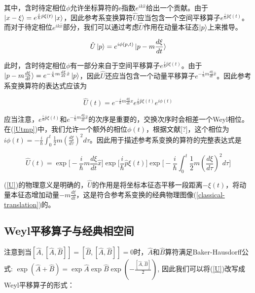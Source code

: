 \documentclass[a4paper]{article}
\begin{document}
        其中，含时待定相位$\phi$允许坐标算符的e指数$e^{ik\hat{x}}$给出一个贡献。由于$\ket{x-\xi}=e^{\frac{i}{\hbar}\hat{p}\xi(t)}\ket{x}$，因此参考系变换算符$\hat{U}$应当包含一个空间平移算子$e^{\frac{i}{\hbar}\hat{p}\xi(t)}$。而对于待定相位$e^{ik\hat{x}}$部分，我们可以通过考虑$\hat{U}$作用在动量本征态$\ket{p}$上来推导。

        \begin{equation}
            \hat{U}\ket{p}=e^{i\phi(p,t)}\ket{p-m\frac{d\xi}{dt}}
        \end{equation}

        此时，含时待定相位$\phi$有一部分来自于空间平移算子$e^{\frac{i}{\hbar}\hat{p}\xi(t)}$。由于$\ket{p-m\frac{d\xi}{dt}}=e^{-\frac{i}{\hbar}m\frac{d\xi}{dt}\hat{x}}\ket{p}$，因此$\hat{U}$还应当包含一个动量平移算子$e^{-\frac{i}{\hbar}m\frac{d\xi}{dt}\hat{x}}$。因此参考系变换算符的表达式应该为

        \begin{equation}\label{Utmp}
            \hat{U}(t)=e^{-\frac{i}{\hbar}m\frac{d\xi}{dt}\hat{x}}e^{\frac{i}{\hbar}\hat{p}\xi(t)}e^{i\phi(t)} 
        \end{equation}

        应当注意，$e^{\frac{i}{\hbar}\hat{p}\xi(t)}$和$e^{-\frac{i}{\hbar}m\frac{d\xi}{dt}\hat{x}}$的次序是重要的，交换次序时会相差一个Weyl相位。在(\ref{Utmp})中，我们允许一个额外的相位$\phi(t)$，根据文献[?]，这个相位为$i\phi(t)=-\frac{i}{\hbar}\int_0^t\frac{1}{2}m(\frac{d \xi}{d\tau})^2 d\tau$。因此用于描述参考系变换的算符的完整表达式是

        \begin{equation}\label{U}
            \hat{U}(t) = \exp\biggl[-\frac{i}{\hbar}m\frac{d\xi}{dt}\hat{x}\biggr] \exp\biggl[\frac{i}{\hbar}\hat{p}\xi(t)\biggr] \exp\biggl[-\frac{i}{\hbar}\int_0^t\frac{1}{2}m(\frac{d \xi}{d\tau})^2 d\tau\biggr]
        \end{equation}

        (\ref{U})的物理意义是明确的，$\hat{U}$的作用是将坐标本征态平移一段距离$-\xi(t)$，将动量本征态增加动量$-m\frac{d \xi}{dt}$，这是符合参考系变换的经典物理图像(\ref{classical-translation})的。


    \subsection{Weyl平移算子与经典相空间}

        注意到当$[\hat{A}, [\hat{A}, \hat{B}]]=[\hat{B}, [\hat{A}, \hat{B}]]=0$时，$\hat{A}$和$\hat{B}$算符满足Baker-Hausdorff公式: $\exp(\hat{A}+\hat{B})=\exp\hat{A} \exp\hat{B} \exp(-\frac{[\hat{A}, \hat{B}]}{2})$, 因此我们可以将(\ref{U})改写成Weyl平移算子的形式：
\end{document}
